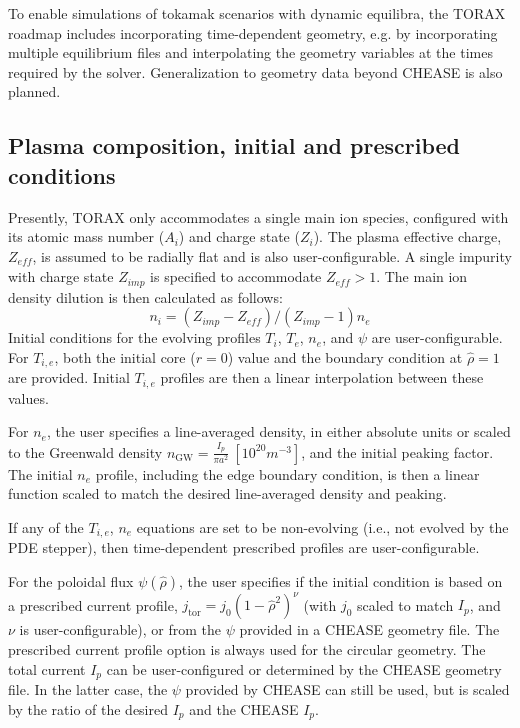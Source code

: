 \documentclass[aps, reprint, nofootinbib]{revtex4-2}
\newcommand{\rnorm}{\hat{\rho}}
\begin{document}

To enable simulations of tokamak scenarios with dynamic equilibra, the TORAX roadmap includes incorporating time-dependent geometry, e.g. by incorporating multiple equilibrium files and interpolating the geometry variables at the times required by the solver. Generalization to geometry data beyond CHEASE is also planned.

\subsection{Plasma composition, initial and prescribed conditions}

Presently, TORAX only accommodates a single main ion species, configured with its atomic mass number ($A_i$) and charge state ($Z_i$). The plasma effective charge, $Z_\textit{eff}$, is assumed to be radially flat and is also user-configurable. A single impurity with charge state $Z_\textit{imp}$ is specified to accommodate $Z_\textit{eff} > 1$. The main ion density dilution is then calculated as follows:
\begin{equation}
n_i=(Z_\textit{imp}-Z_\textit{eff})/(Z_\textit{imp}-1)n_e
\end{equation}
%
Initial conditions for the evolving profiles $T_i$, $T_e$, $n_e$, and $\psi$ are user-configurable. For $T_{i,e}$, both the initial core ($r=0$) value and the boundary condition at $\rnorm=1$ are provided. Initial $T_{i,e}$ profiles are then a linear interpolation between these values.

For $n_e$, the user specifies a line-averaged density, in either absolute units or scaled to the Greenwald density $n_\mathrm{GW}=\frac{I_p}{\pi a^2}~[10^{20} m^{-3}]$, and the initial peaking factor. The initial $n_e$ profile, including the edge boundary condition, is then a linear function scaled to match the desired line-averaged density and peaking.

If any of the $T_{i,e}$, $n_e$ equations are set to be non-evolving (i.e., not evolved by the PDE stepper), then time-dependent prescribed profiles are user-configurable.

For the poloidal flux $\psi(\hat{\rho})$, the user specifies if the initial condition is based on a prescribed current profile, $j_\mathrm{tor}=j_0(1-\rnorm^2)^\nu$ (with $j_0$ scaled to match $I_p$, and $\nu$ is user-configurable), or from the $\psi$ provided in a CHEASE geometry file. The prescribed current profile option is always used for the circular geometry. The total current $I_p$ can be user-configured or determined by the CHEASE geometry file. In the latter case, the $\psi$ provided by CHEASE can still be used, but is scaled by the ratio of the desired $I_p$ and the CHEASE $I_p$.
\end{document}
